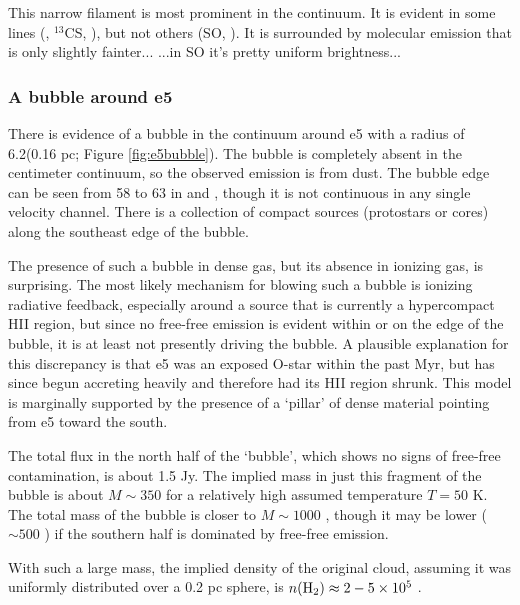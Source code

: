 \documentclass{aa}
\begin{document}
This narrow filament is most prominent in the continuum. It is evident
in some lines (\formaldehyde, $^{13}$CS, \ceighteeno), but not others (SO, ).
It is surrounded by molecular emission that is only slightly fainter...
...in SO it's pretty uniform brightness...

\subsubsection{A bubble around e5}
There is evidence of a bubble in the continuum around e5 with a radius of
6.2\arcsec (0.16 pc; Figure \ref{fig:e5bubble}).  The bubble is completely
absent in the centimeter continuum, so the observed emission is from dust.  The
bubble edge can be seen from 58 \kms to 63 \kms in \ceighteeno and
\formaldehyde, though it is not continuous in any single velocity channel.
There is a collection of compact sources (protostars or cores) along the
southeast edge of the bubble.

The presence of such a bubble in dense gas, but its absence in ionizing gas, is
surprising.  The most likely mechanism for blowing such a bubble is ionizing
radiative feedback, especially around a source that is currently a hypercompact
HII region, but since no free-free emission is evident within or on the edge of
the bubble, it is at least not presently driving the bubble.  A plausible
explanation for this discrepancy is that e5 was an exposed O-star within the
past Myr, but has since begun accreting heavily and therefore had its HII
region shrunk.  This model is marginally supported by the presence of a `pillar'
of dense material pointing from e5 toward the south.

The total flux in the north half of the `bubble', which shows no signs of
free-free contamination, is about 1.5 Jy.  The implied mass in just this
fragment of the bubble is about $M\sim350$ \msun for a relatively high assumed
temperature $T=50$ K.  The total mass of the bubble is closer to $M\sim1000$
\msun, though it may be lower ($\sim500$ \msun) if the southern half is
dominated by free-free emission.

With such a large mass, the implied density of the original cloud, assuming it
was uniformly distributed over a 0.2 pc sphere, is $n(\textrm{H}_{2}) \approx 2-5\times10^{5}$
\percc.
\end{document}
